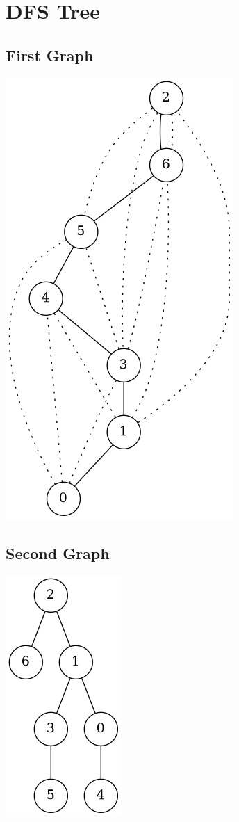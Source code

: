 \documentclass[a4paper,12pt]{extarticle}
\begin{document}
	\section{DFS Tree}

	\subsection{First Graph}

	\includegraphics[scale=.6]{dfs/1}

	\subsection{Second Graph}

	\includegraphics[scale=.6]{dfs/2}
\end{document}
